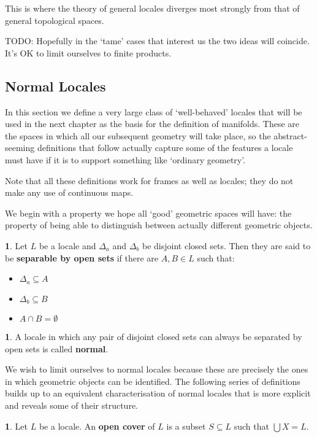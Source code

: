 \documentclass[oneside,english]{amsbook}
\numberwithin{section}{chapter}
\theoremstyle{plain}
\theoremstyle{definition}
\newtheorem{defn}[thm]{\protect\definitionname}
\providecommand{\definitionname}{Definition}
\begin{document}
This is where the theory of general locales diverges most strongly from that of general topological spaces. 

TODO: Hopefully in the `tame' cases that interest us the two ideas will coincide. It's OK to limit ourselves to finite products.


\subsection{Normal Locales}

In this section we define a very large class of `well-behaved' locales that will be used in the next chapter as the basis for the definition of manifolds. These are the spaces in which all our subsequent geometry will take place, so the abstract-seeming definitions that follow actually capture some of the features a locale must have if it is to support something like `ordinary geometry'.

Note that all these definitions work for frames as well as locales; they do not make any use of continuous maps. 

We begin with a property we hope all `good' geometric spaces will have: the property of being able to distinguish between actually different geometric objects. 

\begin{defn}
	Let $L$ be a locale and $\Delta_a$ and $\Delta_b$ be disjoint closed sets. Then they are said to be \textbf{separable by open sets} if there are $A, B\in L$ such that:\begin{itemize}
		\item $\Delta_a \subseteq A$
		\item $\Delta_b \subseteq B$
		\item $A\cap B = \emptyset$
	\end{itemize}
\end{defn}

\begin{defn}
	A locale in which any pair of disjoint closed sets can always be separated by open sets is called \textbf{normal}.
\end{defn}

We wish to limit ourselves to normal locales because these are precisely the ones in which geometric objects can be identified. The following series of definitions builds up to an equivalent characterisation of normal locales that is more explicit and reveals some of their structure.

\begin{defn}
	Let $L$ be a locale. An \textbf{open cover} of $L$ is a subset $S\subseteq L$ such that $\bigcup X = L$.
\end{defn}
\end{document}
